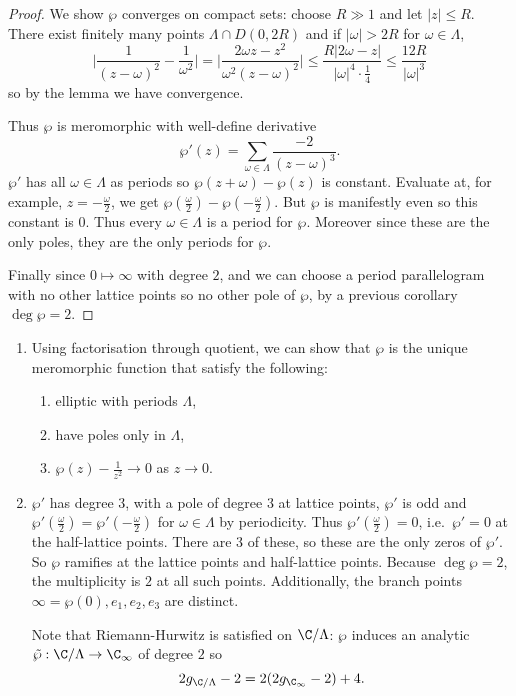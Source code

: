 \documentclass[a4paper]{article}
\begin{document}
\begin{proof}
  We show \(\wp\) converges on compact sets: choose \(R \gg 1\) and let \(|z| \leq R\). There exist finitely many points \(\Lambda \cap D(0, 2R)\) and if \(|\omega| > 2R\) for \(\omega \in \Lambda\),
  \[
    \Bigg| \frac{1}{(z - \omega)^2} - \frac{1}{\omega^2} \Bigg|
    = \Bigg| \frac{2\omega z - z^2}{\omega^2(z - \omega)^2} \Bigg|
    \leq \frac{R |2\omega - z|}{|\omega|^4 \cdot \frac{1}{4}}
    \leq \frac{12R}{|\omega|^3}
  \]
  so by the lemma we have convergence.

  Thus \(\wp\) is meromorphic with well-define derivative
  \[
    \wp'(z) = \sum_{\omega \in \Lambda} \frac{-2}{(z - \omega)^3}.
  \]
  \(\wp'\) has all \(\omega \in \Lambda\) as periods so \(\wp(z + \omega) - \wp(z)\) is constant. Evaluate at, for example, \(z = - \frac{\omega}{2}\), we get \(\wp(\frac{\omega}{2}) - \wp(-\frac{\omega}{2})\). But \(\wp\) is manifestly even so this constant is \(0\). Thus every \(\omega \in \Lambda\) is a period for \(\wp\). Moreover since these are the only poles, they are the only periods for \(\wp\).

  Finally since \(0 \mapsto \infty\) with degree \(2\), and we can choose a period parallelogram with no other lattice points so no other pole of \(\wp\), by a previous corollary \(\deg \wp = 2\).
\end{proof}

\begin{remark}\leavevmode
  \begin{enumerate}
  \item Using factorisation through quotient, we can show that \(\wp\) is the unique meromorphic function that satisfy the following:
    \begin{enumerate}
    \item elliptic with periods \(\Lambda\),
    \item have poles only in \(\Lambda\),
    \item \(\wp(z) - \frac{1}{z^2} \to 0\) as \(z \to 0\).
    \end{enumerate}
  \item \(\wp'\) has degree \(3\), with a pole of degree \(3\) at lattice points, \(\wp'\) is odd and \(\wp'(\frac{\omega}{2}) = \wp'(-\frac{\omega}{2})\) for \(\omega \in \Lambda\) by periodicity. Thus \(\wp'(\frac{\omega}{2}) = 0\), i.e.\ \(\wp' = 0\) at the half-lattice points. There are 3 of these, so these are the only zeros of \(\wp'\). So \(\wp\) ramifies at the lattice points and half-lattice points. Because \(\deg \wp = 2\), the multiplicity is \(2\) at all such points. Additionally, the branch points \(\infty = \wp(0), e_1, e_2, e_3\) are distinct.

    Note that Riemann-Hurwitz is satisfied on \(\C/\Lambda\): \(\wp\) induces an analytic \(\tilde \wp: \C/\Lambda \to \C_\infty\) of degree \(2\) so
    \[
      2g_{\C/\Lambda} - 2 = 2(2 g_{\C_\infty} - 2) + 4.
    \]
  \end{enumerate}
\end{remark}
\end{document}
